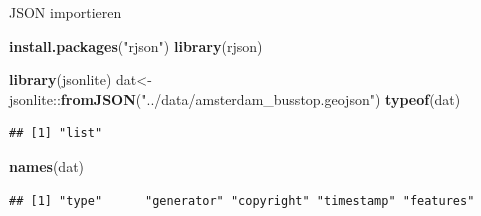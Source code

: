 \documentclass[ignorenonframetext,]{beamer}
\newenvironment{Shaded}{\begin{snugshade}}{\end{snugshade}}
\newcommand{\KeywordTok}[1]{\textcolor[rgb]{0.26,0.66,0.93}{\textbf{#1}}}
\newcommand{\NormalTok}[1]{\textcolor[rgb]{0.74,0.68,0.62}{#1}}
\newcommand{\OperatorTok}[1]{\textcolor[rgb]{0.74,0.68,0.62}{#1}}
\newcommand{\StringTok}[1]{\textcolor[rgb]{0.02,0.61,0.04}{#1}}
\begin{document}
\begin{frame}[fragile]{JSON importieren}
\protect\hypertarget{json-importieren}{}

\begin{Shaded}
\begin{Highlighting}[]
\KeywordTok{install.packages}\NormalTok{(}\StringTok{"rjson"}\NormalTok{)}
\KeywordTok{library}\NormalTok{(rjson)}
\end{Highlighting}
\end{Shaded}

\begin{Shaded}
\begin{Highlighting}[]
\KeywordTok{library}\NormalTok{(jsonlite)}
\NormalTok{dat<-jsonlite}\OperatorTok{::}\KeywordTok{fromJSON}\NormalTok{(}\StringTok{"../data/amsterdam_busstop.geojson"}\NormalTok{)}
\KeywordTok{typeof}\NormalTok{(dat)}
\end{Highlighting}
\end{Shaded}

\begin{verbatim}
## [1] "list"
\end{verbatim}

\begin{Shaded}
\begin{Highlighting}[]
\KeywordTok{names}\NormalTok{(dat)}
\end{Highlighting}
\end{Shaded}

\begin{verbatim}
## [1] "type"      "generator" "copyright" "timestamp" "features"
\end{verbatim}

\end{frame}
\end{document}
